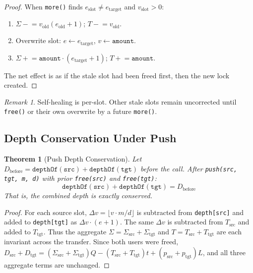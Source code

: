\documentclass[10pt,a4paper,twocolumn]{article}
\theoremstyle{definition}
\theoremstyle{plain}
\newtheorem{theorem}{Theorem}[section]
\theoremstyle{remark}
\newtheorem{remark}{Remark}[section]
\begin{document}
\begin{proof}
When \texttt{more()} finds $e_{\text{slot}} \neq e_{\text{target}}$ and $v_{\text{slot}} > 0$:
\begin{enumerate}[nosep]
\item $\Sigma \mathrel{-}= v_{\text{old}}(e_{\text{old}}{+}1)$; $T \mathrel{-}= v_{\text{old}}$.
\item Overwrite slot: $e \leftarrow e_{\text{target}}$, $v \leftarrow \texttt{amount}$.
\item $\Sigma \mathrel{+}= \texttt{amount} \cdot (e_{\text{target}}{+}1)$; $T \mathrel{+}= \texttt{amount}$.
\end{enumerate}
The net effect is as if the stale slot had been freed first, then the new lock created.
\end{proof}

\begin{remark}
Self-healing is per-slot. Other stale slots remain uncorrected until \texttt{free()} or their own overwrite by a future \texttt{more()}.
\end{remark}

\subsection{Depth Conservation Under Push}

\begin{theorem}[Push Depth Conservation]
\label{thm:push-conservation}
Let $D_{\text{before}} = \texttt{depthOf}(\texttt{src}) + \texttt{depthOf}(\texttt{tgt})$ before the call. After \texttt{push(src, tgt, m, d)} with prior \texttt{free(src)} and \texttt{free(tgt)}:
\[
\texttt{depthOf}(\texttt{src}) + \texttt{depthOf}(\texttt{tgt}) = D_{\text{before}}
\]
That is, the combined depth is exactly conserved.
\end{theorem}

\begin{proof}
For each source slot, $\Delta v = \lfloor v \cdot m/d \rfloor$ is subtracted from \texttt{depth[src]} and added to \texttt{depth[tgt]} as $\Delta v \cdot (e{+}1)$. The same $\Delta v$ is subtracted from $T_{\text{src}}$ and added to $T_{\text{tgt}}$. Thus the aggregate $\Sigma = \Sigma_{\text{src}} + \Sigma_{\text{tgt}}$ and $T = T_{\text{src}} + T_{\text{tgt}}$ are each invariant across the transfer. Since both users were freed, $D_{\text{src}} + D_{\text{tgt}} = (\Sigma_{\text{src}} + \Sigma_{\text{tgt}})Q - (T_{\text{src}} + T_{\text{tgt}})t + (p_{\text{src}} + p_{\text{tgt}})L$, and all three aggregate terms are unchanged.
\end{proof}
\end{document}
